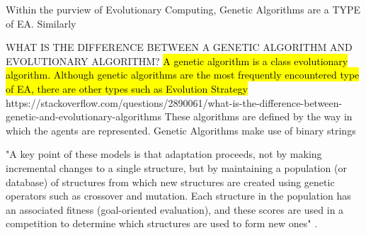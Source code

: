 





Within the purview of Evolutionary Computing, Genetic Algorithms are a TYPE of EA. Similarly




WHAT IS THE DIFFERENCE BETWEEN A GENETIC ALGORITHM AND EVOLUTIONARY ALGORITHM?
\hl{A genetic algorithm is a class evolutionary algorithm. Although genetic algorithms are the most frequently encountered type of EA, there are other types such as Evolution Strategy}
https://stackoverflow.com/questions/2890061/what-is-the-difference-between-genetic-and-evolutionary-algorithms
These algorithms are defined by the way in which the agents are represented. Genetic Algorithms make use of binary strings








"A key point of these models is that adaptation proceeds, not by making incremental changes to a single structure, but by maintaining a population (or database) of structures from which new structures are created using genetic operators such as crossover and mutation. Each structure in the population has an associated fitness (goal-oriented evaluation), and these scores are used in a competition to determine which structures are used to form new ones" \cite{de1988learning}.


